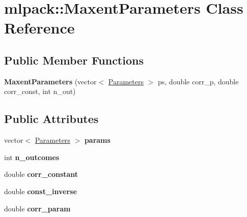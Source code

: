 \hypertarget{classmlpack_1_1_maxent_parameters}{
\section{mlpack::MaxentParameters Class Reference}
\label{classmlpack_1_1_maxent_parameters}
}
\subsection*{Public Member Functions}
\begin{DoxyCompactItemize}
\item 
\hypertarget{classmlpack_1_1_maxent_parameters_a8a2fefa3c44532441401a25a550dbcf1}{
{\bfseries MaxentParameters} (vector$<$ \hyperlink{classmlpack_1_1_parameters}{Parameters} $>$ ps, double corr\_\-p, double corr\_\-const, int n\_\-out)}
\label{classmlpack_1_1_maxent_parameters_a8a2fefa3c44532441401a25a550dbcf1}

\end{DoxyCompactItemize}
\subsection*{Public Attributes}
\begin{DoxyCompactItemize}
\item 
\hypertarget{classmlpack_1_1_maxent_parameters_a9c031c4f1ff7c16fcadedf18f97e4541}{
vector$<$ \hyperlink{classmlpack_1_1_parameters}{Parameters} $>$ {\bfseries params}}
\label{classmlpack_1_1_maxent_parameters_a9c031c4f1ff7c16fcadedf18f97e4541}

\item 
\hypertarget{classmlpack_1_1_maxent_parameters_a83832c17dd75a64680e3ec9b158ee066}{
int {\bfseries n\_\-outcomes}}
\label{classmlpack_1_1_maxent_parameters_a83832c17dd75a64680e3ec9b158ee066}

\item 
\hypertarget{classmlpack_1_1_maxent_parameters_adb77778a4f8f9b949b14067de6cb6d85}{
double {\bfseries corr\_\-constant}}
\label{classmlpack_1_1_maxent_parameters_adb77778a4f8f9b949b14067de6cb6d85}

\item 
\hypertarget{classmlpack_1_1_maxent_parameters_aaa904a124b94c2c1b0433b1721bd746c}{
double {\bfseries const\_\-inverse}}
\label{classmlpack_1_1_maxent_parameters_aaa904a124b94c2c1b0433b1721bd746c}

\item 
\hypertarget{classmlpack_1_1_maxent_parameters_a13d16c4a737d177f45f094b21fc173cf}{
double {\bfseries corr\_\-param}}
\label{classmlpack_1_1_maxent_parameters_a13d16c4a737d177f45f094b21fc173cf}

\end{DoxyCompactItemize}
